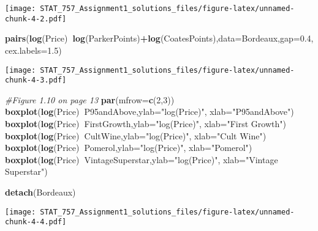 \documentclass[]{article}
\newenvironment{Shaded}{\begin{snugshade}}{\end{snugshade}}
\newcommand{\CommentTok}[1]{\textcolor[rgb]{0.56,0.35,0.01}{\textit{#1}}}
\newcommand{\DataTypeTok}[1]{\textcolor[rgb]{0.13,0.29,0.53}{#1}}
\newcommand{\DecValTok}[1]{\textcolor[rgb]{0.00,0.00,0.81}{#1}}
\newcommand{\FloatTok}[1]{\textcolor[rgb]{0.00,0.00,0.81}{#1}}
\newcommand{\KeywordTok}[1]{\textcolor[rgb]{0.13,0.29,0.53}{\textbf{#1}}}
\newcommand{\NormalTok}[1]{#1}
\newcommand{\OperatorTok}[1]{\textcolor[rgb]{0.81,0.36,0.00}{\textbf{#1}}}
\newcommand{\StringTok}[1]{\textcolor[rgb]{0.31,0.60,0.02}{#1}}
\begin{document}
\texttt{[image: STAT\_757\_Assignment1\_solutions\_files/figure-latex/unnamed-chunk-4-2.pdf]}

\begin{Shaded}
\begin{Highlighting}[]
\KeywordTok{pairs}\NormalTok{(}\KeywordTok{log}\NormalTok{(Price)}\OperatorTok{~}\KeywordTok{log}\NormalTok{(ParkerPoints)}\OperatorTok{+}\KeywordTok{log}\NormalTok{(CoatesPoints),}\DataTypeTok{data=}\NormalTok{Bordeaux,}\DataTypeTok{gap=}\FloatTok{0.4}\NormalTok{,}\DataTypeTok{cex.labels=}\FloatTok{1.5}\NormalTok{)}
\end{Highlighting}
\end{Shaded}

\texttt{[image: STAT\_757\_Assignment1\_solutions\_files/figure-latex/unnamed-chunk-4-3.pdf]}

\begin{Shaded}
\begin{Highlighting}[]
\CommentTok{#Figure 1.10 on page 13}
\KeywordTok{par}\NormalTok{(}\DataTypeTok{mfrow=}\KeywordTok{c}\NormalTok{(}\DecValTok{2}\NormalTok{,}\DecValTok{3}\NormalTok{))}
\KeywordTok{boxplot}\NormalTok{(}\KeywordTok{log}\NormalTok{(Price)}\OperatorTok{~}\NormalTok{P95andAbove,}\DataTypeTok{ylab=}\StringTok{"log(Price)"}\NormalTok{,}
\DataTypeTok{xlab=}\StringTok{"P95andAbove"}\NormalTok{)}
\KeywordTok{boxplot}\NormalTok{(}\KeywordTok{log}\NormalTok{(Price)}\OperatorTok{~}\NormalTok{FirstGrowth,}\DataTypeTok{ylab=}\StringTok{"log(Price)"}\NormalTok{,}
\DataTypeTok{xlab=}\StringTok{"First Growth"}\NormalTok{)}
\KeywordTok{boxplot}\NormalTok{(}\KeywordTok{log}\NormalTok{(Price)}\OperatorTok{~}\NormalTok{CultWine,}\DataTypeTok{ylab=}\StringTok{"log(Price)"}\NormalTok{,}
\DataTypeTok{xlab=}\StringTok{"Cult Wine"}\NormalTok{)}
\KeywordTok{boxplot}\NormalTok{(}\KeywordTok{log}\NormalTok{(Price)}\OperatorTok{~}\NormalTok{Pomerol,}\DataTypeTok{ylab=}\StringTok{"log(Price)"}\NormalTok{,}
\DataTypeTok{xlab=}\StringTok{"Pomerol"}\NormalTok{)}
\KeywordTok{boxplot}\NormalTok{(}\KeywordTok{log}\NormalTok{(Price)}\OperatorTok{~}\NormalTok{VintageSuperstar,}\DataTypeTok{ylab=}\StringTok{"log(Price)"}\NormalTok{,}
\DataTypeTok{xlab=}\StringTok{"Vintage Superstar"}\NormalTok{)}

\KeywordTok{detach}\NormalTok{(Bordeaux)}
\end{Highlighting}
\end{Shaded}

\texttt{[image: STAT\_757\_Assignment1\_solutions\_files/figure-latex/unnamed-chunk-4-4.pdf]}
\end{document}
